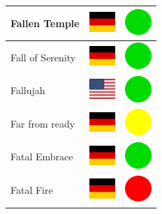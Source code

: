 \documentclass[12pt, a4paper, twoside]{report}
\begin{document}
\begin{center}
\begin{longtable}{|p{5cm}|p{2cm}|p{2cm}|}
 Fallen Temple                                              & \includegraphics[width=1cm]{../img/flags/de} &   \includegraphics[width=1cm]{../likes/y} \\ \hline
 Fall of Serenity                                           & \includegraphics[width=1cm]{../img/flags/de} &   \includegraphics[width=1cm]{../likes/y} \\ \hline
 Fallujah                                                   & \includegraphics[width=1cm]{../img/flags/us} &   \includegraphics[width=1cm]{../likes/y} \\ \hline
 Far from ready                                             & \includegraphics[width=1cm]{../img/flags/de} &   \includegraphics[width=1cm]{../likes/m} \\ \hline
 Fatal Embrace                                              & \includegraphics[width=1cm]{../img/flags/de} &   \includegraphics[width=1cm]{../likes/y} \\ \hline
 Fatal Fire                                                 & \includegraphics[width=1cm]{../img/flags/de} &   \includegraphics[width=1cm]{../likes/n} \\ \hline

\end{longtable}
\end{center}
\end{document}
